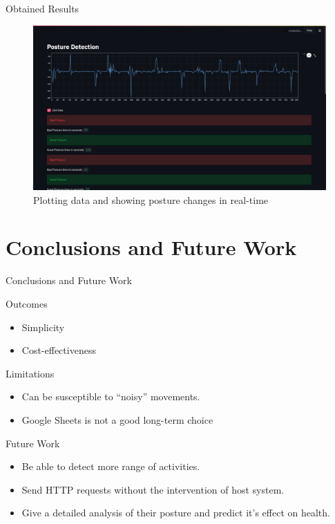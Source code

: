 \documentclass[aspectratio=169,xcolor=dvipsnames]{beamer}
\begin{document}
\begin{frame}{Obtained Results}
    \begin{figure}
        \centering
        \includegraphics[scale=0.18]{webappss2.png}
        \caption{Plotting data and showing posture changes in real-time}
        \label{fig:results}
    \end{figure}

\end{frame}

\section{Conclusions and Future Work}

\begin{frame}{Conclusions and Future Work}
    \begin{block}{Outcomes}
        \begin{itemize}
            \item Simplicity
            \item Cost-effectiveness
        \end{itemize}
    \end{block}
    \begin{block}{Limitations}
        \begin{itemize}
            \item Can be susceptible to ``noisy'' movements.
            \item Google Sheets is not a good long-term choice
        \end{itemize}
    \end{block}
    \begin{block}{Future Work}
        \begin{itemize}
            \item Be able to detect more range of activities.
            \item Send HTTP requests without the intervention of host system.
            \item Give a detailed analysis of their posture and predict it's
                effect on health.
        \end{itemize}

    \end{block}
\end{frame}
\end{document}
